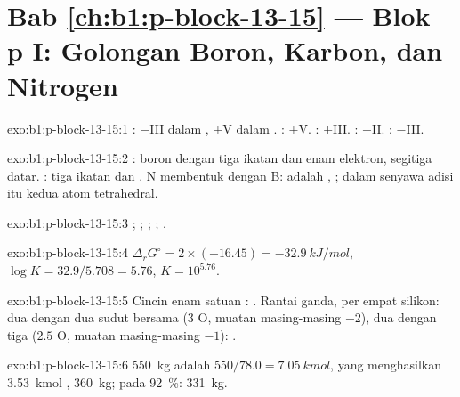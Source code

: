 \section*{Bab \ref{ch:b1:p-block-13-15} --- Blok p I: Golongan Boron, Karbon, dan Nitrogen}

\begin{solution}{exo:b1:p-block-13-15:1}
: $-$III dalam , $+$V dalam . : $+$V.
: $+$III. : $-$II. : $-$III.
\end{solution}

\begin{solution}{exo:b1:p-block-13-15:2}
: boron dengan tiga ikatan dan enam elektron, segitiga datar.
: tiga ikatan dan . 
N membentuk  dengan B:  adalah , 
; dalam senyawa adisi itu kedua atom tetrahedral.
\end{solution}

\begin{solution}{exo:b1:p-block-13-15:3}
; ;
; ;
.
\end{solution}

\begin{solution}{exo:b1:p-block-13-15:4}
$\Delta_r G^\circ = 2 \times (-16.45) = \qty{-32.9}{kJ/mol}$, $\log K =
32.9/5.708 = 5.76$, $K = 10^{5.76}$.
\end{solution}

\begin{solution}{exo:b1:p-block-13-15:5}
Cincin enam satuan : . Rantai ganda, per empat
silikon: dua dengan dua sudut bersama (3 O, muatan masing-masing $-2$),
dua dengan tiga ($2.5$ O, muatan masing-masing $-1$): .
\end{solution}

\begin{solution}{exo:b1:p-block-13-15:6}
\qty{550}{kg}  adalah $550/78.0 = \qty{7.05}{kmol}$, yang
menghasilkan \qty{3.53}{kmol} , \qty{360}{kg}; pada
\qty{92}{\percent}: \qty{331}{kg}.
\end{solution}

